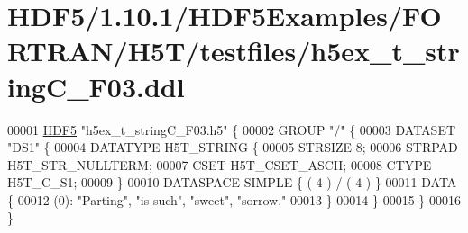\hypertarget{_h_d_f5_21_810_81_2_h_d_f5_examples_2_f_o_r_t_r_a_n_2_h5_t_2testfiles_2h5ex__t__string_c___f03_8ddl_source}{}\section{H\+D\+F5/1.10.1/\+H\+D\+F5\+Examples/\+F\+O\+R\+T\+R\+A\+N/\+H5\+T/testfiles/h5ex\+\_\+t\+\_\+string\+C\+\_\+\+F03.ddl}
\label{_h_d_f5_21_810_81_2_h_d_f5_examples_2_f_o_r_t_r_a_n_2_h5_t_2testfiles_2h5ex__t__string_c___f03_8ddl_source}

\begin{DoxyCode}
00001 \hyperlink{namespace_h_d_f5}{HDF5} \textcolor{stringliteral}{"h5ex\_t\_stringC\_F03.h5"} \{
00002 GROUP \textcolor{stringliteral}{"/"} \{
00003    DATASET \textcolor{stringliteral}{"DS1"} \{
00004       DATATYPE  H5T\_STRING \{
00005          STRSIZE 8;
00006          STRPAD H5T\_STR\_NULLTERM;
00007          CSET H5T\_CSET\_ASCII;
00008          CTYPE H5T\_C\_S1;
00009       \}
00010       DATASPACE  SIMPLE \{ ( 4 ) / ( 4 ) \}
00011       DATA \{
00012       (0): \textcolor{stringliteral}{"Parting"}, \textcolor{stringliteral}{"is such"}, \textcolor{stringliteral}{"sweet"}, \textcolor{stringliteral}{"sorrow."}
00013       \}
00014    \}
00015 \}
00016 \}
\end{DoxyCode}
